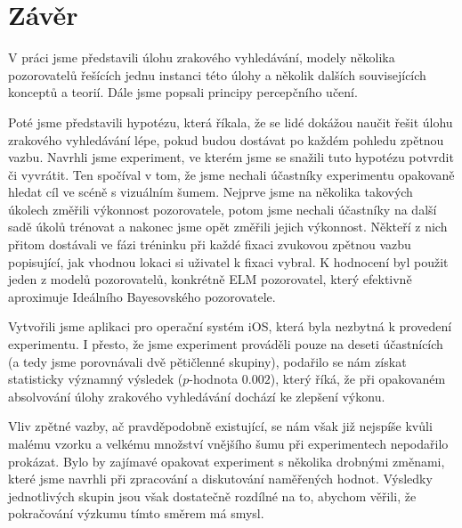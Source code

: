 \chapter*{Závěr}

V práci jsme představili úlohu zrakového vyhledávání, modely několika pozorovatelů
řešících jednu instanci této úlohy a několik dalších souvisejících konceptů a
teorií. Dále jsme popsali principy percepčního učení.

Poté jsme představili hypotézu, která říkala, že se lidé dokážou naučit řešit
úlohu zrakového vyhledávání lépe, pokud budou dostávat po každém pohledu
zpětnou vazbu. Navrhli jsme experiment, ve kterém jsme se snažili tuto hypotézu
potvrdit či vyvrátit. Ten spočíval v tom, že jsme nechali účastníky experimentu
opakovaně hledat cíl ve scéně s vizuálním šumem. Nejprve jsme na několika
takových úkolech změřili výkonnost pozorovatele, potom jsme nechali účastníky
na další sadě úkolů trénovat a nakonec jsme opět změřili jejich výkonnost.
Někteří z nich přitom dostávali ve fázi tréninku při každé fixaci zvukovou
zpětnou vazbu popisující, jak vhodnou lokaci si uživatel k fixaci vybral. K
hodnocení byl použit jeden z modelů pozorovatelů, konkrétně ELM pozorovatel, který efektivně aproximuje Ideálního Bayesovského pozorovatele.

Vytvořili jsme aplikaci pro operační systém iOS, která byla nezbytná k
provedení experimentu. I přesto, že jsme experiment prováděli pouze na deseti
účastnících (a tedy jsme porovnávali dvě pětičlenné skupiny), podařilo se nám
získat statisticky významný výsledek ($p$-hodnota $0.002$), který říká, že při
opakovaném absolvování úlohy zrakového vyhledávání dochází ke zlepšení výkonu.

Vliv zpětné vazby, ač pravděpodobně existující, se nám však již nejspíše kvůli
malému vzorku a velkému množství vnějšího šumu při experimentech
nepodařilo prokázat. Bylo by zajímavé opakovat experiment s několika drobnými
změnami, které jsme navrhli při zpracování a diskutování naměřených hodnot.
Výsledky jednotlivých skupin jsou však dostatečně rozdílné na to, abychom věřili, že pokračování
výzkumu tímto směrem má smysl.
